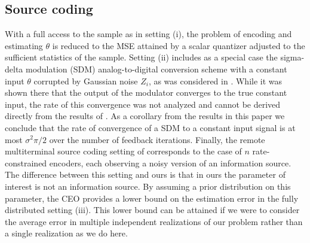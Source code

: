 \documentclass[letterpaper, conference, 11pt]{IEEEtran}      %
\begin{document}

\subsection*{Source coding}
With a full access to the sample as in setting (i), the problem of encoding and estimating $\theta$ is reduced to the MSE attained by a scalar quantizer adjusted to the sufficient statistics of the sample. Setting (ii) includes as a special case the sigma-delta modulation (SDM) analog-to-digital conversion scheme with a constant input $\theta$ corrupted by Gaussian noise $Z_i$, as was considered in \cite{53738}. While it was shown there that the output of the modulator converges to the true constant input, the rate of this convergence was not analyzed and cannot be derived directly from the results of \cite{53738}. As a corollary from the results in this paper we conclude that the rate of convergence of a SDM to a constant input signal is at most $\sigma^2\pi/2$ over the number of feedback iterations. Finally, the remote multiterminal source coding setting of \cite{berger1996ceo} corresponds to the case of $n$ rate-constrained encoders, each observing a noisy version of an information source. The difference between this setting and ours is that in ours the parameter of interest is not an information source. By assuming a prior distribution on this parameter, the CEO provides a lower bound on the estimation error in the fully distributed setting (iii). This lower bound can be attained if we were to consider the average error in multiple independent realizations of our problem rather than a single realization as we do here. \\
\end{document}
